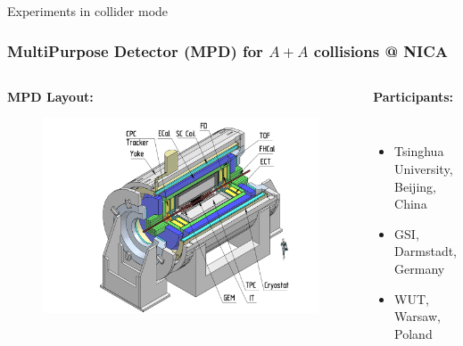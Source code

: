 \documentclass[dvipsnames] {beamer}
\begin{document}
\begin{frame}
  \bf
  \begin{block}{}
    \begin{center}
      {\Huge Experiments in collider mode}
    \end{center}
  \end{block}
\end{frame}

\begin{frame}
  \bf
   \vskip -0.3cm
  \frametitle{\centering \bf {\small MultiPurpose Detector (MPD) for $A + A$ collisions @ NICA}}
  \begin{columns}[t]
    \vskip -0.5cm
    \begin{block}{\bf \centering MPD Layout:}
      \begin{figure}[H]
        \includegraphics[width=1.\textwidth]{mpd.png} 
      \end{figure}
    \end{block}
    \vskip -0.3cm
           {\tiny 
             \begin{block}{\bf \centering Participants:}           
               \begin{columns}[t]
                 \vskip -0.4cm
                 \begin{itemize}
                 \item Tsinghua University, Beijing, China
                 \item GSI, Darmstadt, Germany
                 \item WUT, Warsaw, Poland
                 \end{itemize}
                 

\end{columns}
\end{block}}
\end{columns}
\end{frame}
\end{document}
